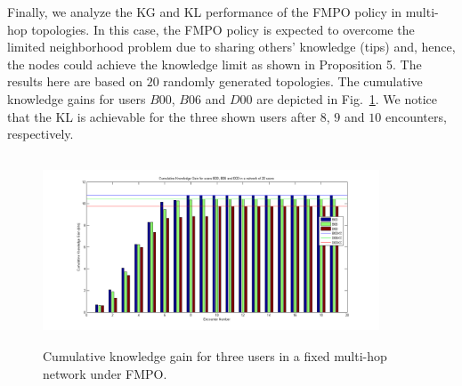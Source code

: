 \documentclass[12pt,epsf]{article}
\theoremstyle{definition}
\begin{document}
Finally, we analyze the KG and KL performance of the FMPO policy in multi-hop topologies. In this case, the FMPO policy is expected to overcome the limited neighborhood problem due to sharing others' knowledge (tips) and, hence, the nodes could achieve the knowledge limit as shown in Proposition 5. The results here are based on $20$ randomly generated topologies.  
The cumulative knowledge gains for users $B00$, $B06$ and $D00$ are depicted in Fig.~\ref{fig:B00_SMHOP_MO)}. We notice that the KL is achievable for the three shown users after $8$, $9$ and $10$ encounters, respectively.
%
  \begin{figure}[!bp]
	\centering
     \includegraphics[width=10cm ,height=5.6cm]{figures_png/Fig8}
    \caption{Cumulative knowledge gain for three users in a fixed multi-hop network under FMPO.}\label{fig:B00_SMHOP_MO)}
\end{figure}
%
\vspace{-0.6 cm}
\end{document}
